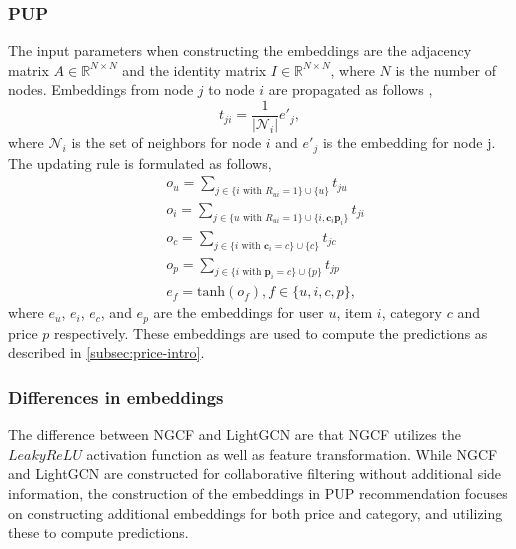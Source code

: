 \subsubsection{PUP}\label{subsubsec:price}
The input parameters when constructing the embeddings are the adjacency matrix $A \in \mathbb{R}^{N \times N}$ and the identity matrix $I \in \mathbb{R}^{N \times N}$, where $N$ is the number of nodes.
Embeddings from node $j$ to node $i$ are propagated as follows \cite{Priceaware},
\begin{equation}
    t_{ji} = \frac{1}{|\mathcal{N}_i|}e'_j,
\end{equation}
where $\mathcal{N}_i$ is the set of neighbors for node $i$ and $e'_j$ is the embedding for node j.
The updating rule is formulated as follows,
\begin{equation}
    \begin{split}
        & o_u = \sum_{j \in \{i \textrm{ with } R_{ui}=1 \} \cup \{ u\}}^{} t_{ju}                            \\
        & o_i = \sum_{j \in \{u \textrm{ with } R_{ui}=1 \} \cup \{ i, \textbf{c}_i \textbf{p}_i\}}^{} t_{ji} \\
        & o_c = \sum_{j \in \{i \textrm{ with } \textbf{c}_i=c \} \cup \{ c\}}^{} t_{jc}                      \\
        & o_p = \sum_{j \in \{i \textrm{ with } \textbf{p}_i=c \} \cup \{ p\}}^{} t_{jp}                      \\
        & e_f = \textrm{tanh}(o_f), f \in \{u, i, c, p\},
    \end{split}
\end{equation}
where $e_u$, $e_i$, $e_c$, and $e_p$ are the embeddings for user $u$, item $i$, category $c$ and price $p$ respectively.
These embeddings are used to compute the predictions as described in \autoref{subsec:price-intro}.

\subsubsection{Differences in embeddings}
The difference between NGCF and LightGCN are that NGCF utilizes the $LeakyReLU$ activation function as well as feature transformation.
While NGCF and LightGCN are constructed for collaborative filtering without additional side information, the construction of the embeddings in PUP recommendation focuses on constructing additional embeddings for both price and category, and utilizing these to compute predictions.

